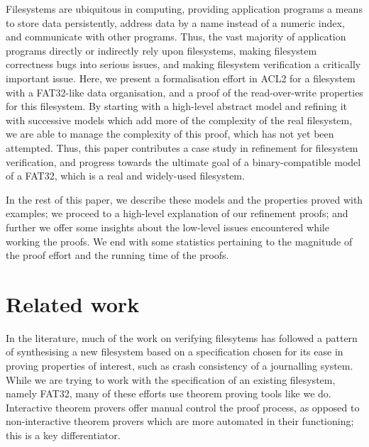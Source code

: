 \documentclass[runningheads,a4paper]{llncs}
\begin{document}
Filesystems are ubiquitous in computing, providing application
programs a means to store data persistently, address data by a name
instead of a numeric index, and communicate with other programs.
Thus, the vast majority of application programs
directly or indirectly rely upon filesystems, making filesystem
correctness bugs into serious issues, and making filesystem
verification a critically important issue. Here, we present a
formalisation effort in ACL2 for a filesystem with a FAT32-like data
organisation, and a proof of the read-over-write properties for this
filesystem. By starting with a high-level abstract model and refining
\cite{abadi1991existence} it with successive models which add more of
the complexity of the real filesystem, we are able to manage the
complexity of this proof, which has not yet been attempted. Thus, this
paper contributes a case study in refinement for filesystem
verification, and progress towards the ultimate goal of a
binary-compatible model of a FAT32, which is a real and widely-used
filesystem.

In the rest of this paper, we describe these
models and the properties proved with examples; we proceed to a
high-level explanation of our refinement proofs; and further we offer
some insights about the low-level issues encountered while working the
proofs. We end with some statistics pertaining to the magnitude of the
proof effort and the running time of the proofs.

\section{Related work}

In the literature, much of the work on verifying filesytems has
followed a pattern of synthesising a new filesystem based on a
specification chosen for its ease in proving properties of interest,
such as crash consistency of a journalling system. While we are trying
to work with the specification of an existing filesystem, namely
FAT32, many of these efforts use theorem proving tools like we
do. Interactive theorem provers offer manual control the proof
process, as opposed to non-interactive theorem provers which are more
automated in their functioning; this is a key differentiator.
\end{document}
